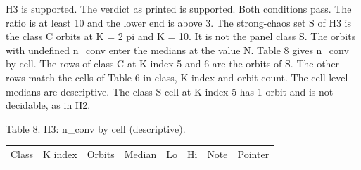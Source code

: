 \documentclass[
  11pt,
]{article}
\newcounter{none} %
\begin{document}
H3 is supported. The verdict as printed is supported. Both conditions
pass. The ratio is at least 10 and the lower end is above 3. The
strong-chaos set S of H3 is the class C orbits at K = 2 pi and K = 10.
It is not the panel class S. The orbits with undefined n\_conv enter the
medians at the value N. Table 8 gives n\_conv by cell. The rows of class
C at K index 5 and 6 are the orbits of S. The other rows match the cells
of Table 6 in class, K index and orbit count. The cell-level medians are
descriptive. The class S cell at K index 5 has 1 orbit and is not
decidable, as in H2.

Table 8. H3: n\_conv by cell (descriptive).

{\def\LTcaptype{none} %
\begin{longtable}[]{@{}
  >{\raggedright\arraybackslash}p{}
  >{\raggedright\arraybackslash}p{}
  >{\raggedright\arraybackslash}p{}
  >{\raggedright\arraybackslash}p{}
  >{\raggedright\arraybackslash}p{}
  >{\raggedright\arraybackslash}p{}
  >{\raggedright\arraybackslash}p{}
  >{\raggedright\arraybackslash}p{}@{}}
\toprule\noalign{}
\begin{minipage}[b]{\linewidth}\raggedright
Class
\end{minipage} & \begin{minipage}[b]{\linewidth}\raggedright
K index
\end{minipage} & \begin{minipage}[b]{\linewidth}\raggedright
Orbits
\end{minipage} & \begin{minipage}[b]{\linewidth}\raggedright
Median
\end{minipage} & \begin{minipage}[b]{\linewidth}\raggedright
Lo
\end{minipage} & \begin{minipage}[b]{\linewidth}\raggedright
Hi
\end{minipage} & \begin{minipage}[b]{\linewidth}\raggedright
Note
\end{minipage} & \begin{minipage}[b]{\linewidth}\raggedright
Pointer
\end{minipage} \\

\end{longtable}}
\end{document}
